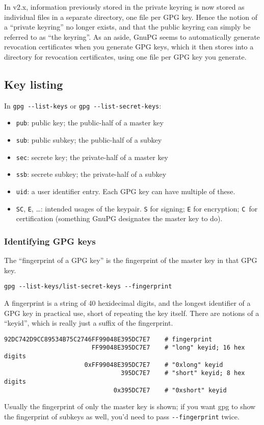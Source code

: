 In v2.x, information previously stored in the private keyring is now stored as
individual files in a separate directory, one file per GPG key. Hence the
notion of a “private keyring” no longer exists, and that the public keyring can
simply be referred to as “the keyring”. As an aside, GnuPG seems to
automatically generate revocation certificates when you generate GPG keys,
which it then stores into a directory for revocation certificates, using one
file per GPG key you generate.

\subsection{Key listing}

In \verb+gpg --list-keys+ or \verb+gpg --list-secret-keys+:
\begin{itemize}
        \item \verb+pub+: public key; the public-half of a master key
        \item \verb+sub+: public subkey; the public-half of a subkey
        \item \verb+sec+: secrete key; the private-half of a master key
        \item \verb+ssb+: secrete subkey; the private-half of a subkey
        \item \verb+uid+: a user identifier entry. Each GPG key can have
            multiple of these.
        \item \verb+SC+, \verb+E+, \ldots: intended usages of the keypair.
            \verb+S+ for signing; \verb+E+ for encryption; \verb+C +for
            certification (something GnuPG designates the master key to do).
\end{itemize}

\subsubsection{Identifying GPG keys}
The “fingerprint of a GPG key” is the fingerprint of the master key in that GPG
key.

\begin{verbatim}
gpg --list-keys/list-secret-keys --fingerprint
\end{verbatim}
A fingerprint is a string of 40 hexidecimal digits, and the longest identifier
of a GPG key in practical use, short of repeating the key itself. There are
notions of a “keyid”, which is really just a suffix of the fingerprint.
\begin{verbatim}
92DC742D9CC89534B75C2746FF99048E395DC7E7    # fingerprint
                        FF99048E395DC7E7    # "long" keyid; 16 hex digits
                      0xFF99048E395DC7E7    # "0xlong" keyid
                                395DC7E7    # "short" keyid; 8 hex digits
                              0x395DC7E7    # "0xshort" keyid
\end{verbatim}
Usually the fingerprint of only the master key is shown; if you want gpg to
show the fingerprint of subkeys as well, you’d need to pass
\verb+--fingerprint+ twice.


